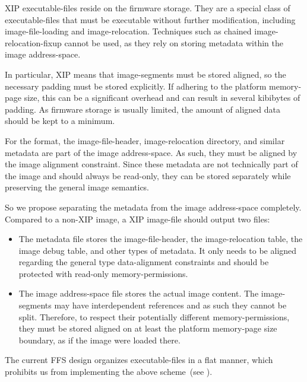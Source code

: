  \gls{XIP} \glspl{executable-file} reside on the \gls{firmware} storage. They are a special class of \glspl{executable-file} that must be executable without further modification, including \gls{image-file-loading} and \gls{image-relocation}. Techniques such as chained \gls{image-relocation-fixup} cannot be used, as they rely on storing metadata within the \gls{image} \gls{address-space}.

In particular, \gls{XIP} means that \glspl{image-segment} must be stored aligned, so the necessary padding must be stored explicitly. If adhering to the platform \gls{memory-page} size, this can be a significant overhead and can result in several kibibytes of padding. As \gls{firmware} storage is usually limited, the amount of aligned data should be kept to a minimum.

For the  format, the \gls{image-file-header}, \gls{image-relocation} directory, and similar metadata are part of the \gls{image} \gls{address-space}. As such, they must be aligned by the \gls{image} alignment constraint. Since these metadata are not technically part of the \gls{image} and should always be read-only, they can be stored separately while preserving the general \gls{image} semantics.

So we propose separating the metadata from the \gls{image} \gls{address-space} completely. Compared to a non-\gls{XIP} \gls{image}, a \gls{XIP} \gls{image-file} should output two files:
\begin{itemize}
  \item The metadata file stores the \gls{image-file-header}, the \gls{image-relocation} table, the \gls{image} debug table, and other types of metadata. It only needs to be aligned regarding the general type \gls{data-alignment} constraints and should be protected with read-only \gls{memory-permissions}.
  \item The \gls{image} \gls{address-space} file stores the actual \gls{image} content. The \glspl{image-segment} may have interdependent references and as such they cannot be split. Therefore, to respect their potentially different \gls{memory-permissions}, they must be stored aligned on at least the platform \gls{memory-page} size boundary, as if the \gls{image} were loaded there.
\end{itemize}

The current \gls{FFS} design organizes \glspl{executable-file} in a flat manner, which prohibits us from implementing the above scheme~(see ).

